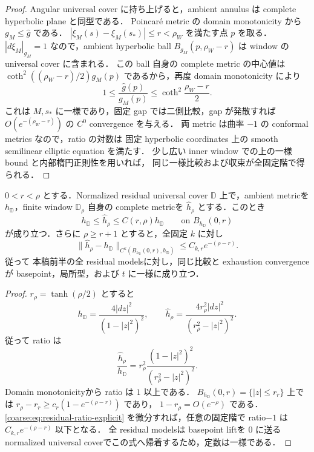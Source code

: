 \documentclass[a4paper,11pt]{ltjsarticle}
\numberwithin{equation}{section}
\theoremstyle{plain}
\theoremstyle{definition}
\theoremstyle{remark}
\begin{document}
\begin{proof}
Angular universal cover に持ち上げると，ambient annulus は complete hyperbolic plane と同型である．
Poincar\'e metric の domain monotonicity から $g_M\le\widehat g$ である．
$|\xi_M(s)-\xi_M(s_*)|\le r<\rho_W$ を満たす点 $p$ を取る．
$|d\xi_M|_{g_M}=1$ なので，ambient hyperbolic ball
$B_{g_M}(p,\rho_W-r)$ は window の universal cover に含まれる．
この ball 自身の complete metric の中心値は
$\coth^2((\rho_W-r)/2)g_M(p)$ であるから，再度 domain monotonicity により
\[
 1\le\frac{\widehat g(p)}{g_M(p)}
 \le\coth^2\!\frac{\rho_W-r}{2}.
\]
これは $M,s_*$ に一様であり，固定 gap では二側比較，gap が発散すれば
$O(e^{-(\rho_W-r)})$ の $C^0$ convergence を与える．
両 metric は曲率 $-1$ の conformal metrics なので，ratio の対数は
固定 hyperbolic coordinates 上の smooth semilinear elliptic equation を満たす．
少し広い inner window での上の一様 bound と内部楕円正則性を用いれば，
同じ一様比較および収束が全固定階で得られる．
\end{proof}

\begin{lemma}\label{coarse:lem:residual-window-comparison}
$0<r<\rho$ とする．Normalized residual universal cover $\mathbb D$ 上で，ambient metricを
$h_{\mathbb D}$，finite window $\mathbb D_\rho$ 自身の complete metricを
$\widehat h_\rho$ とする．このとき
\begin{equation}\label{coarse:eq:residual-window-comparison}
 h_{\mathbb D}\le \widehat h_\rho
 \le C(r,\rho)h_{\mathbb D}
 \qquad\text{on }B_{h_{\mathbb D}}(0,r)
\end{equation}
が成り立つ．さらに $\rho\ge r+1$ とすると，全固定 $k$ に対し
\begin{equation}\label{coarse:eq:residual-window-exhaustion}
 \|\widehat h_\rho-h_{\mathbb D}\|_{C^k(B_{h_{\mathbb D}}(0,r),h_{\mathbb D})}
 \le C_{k,r}e^{-(\rho-r)}.
\end{equation}
従って 本稿前半の全 residual modelsに対し，同じ比較と exhaustion convergenceが basepoint，局所型，および $t$ に一様に成り立つ．
\end{lemma}

\begin{proof}
$r_\rho=\tanh(\rho/2)$ とすると
\[
 h_{\mathbb D}=\frac{4|dz|^2}{(1-|z|^2)^2},
 \qquad
 \widehat h_\rho=\frac{4r_\rho^2|dz|^2}{(r_\rho^2-|z|^2)^2}.
\]
従って ratio は
\begin{equation}\label{coarse:eq:residual-ratio-explicit}
 \frac{\widehat h_\rho}{h_{\mathbb D}}
 =r_\rho^2\frac{(1-|z|^2)^2}{(r_\rho^2-|z|^2)^2}.
\end{equation}
Domain monotonicityから ratio は $1$ 以上である．
$B_{h_{\mathbb D}}(0,r)=\{|z|\le r_r\}$ 上では
$r_\rho-r_r\ge c_r(1-e^{-(\rho-r)})$ であり，
$1-r_\rho=O(e^{-\rho})$ である．
\eqref{coarse:eq:residual-ratio-explicit} を微分すれば，任意の固定階で
ratio$-1$ は $C_{k,r}e^{-(\rho-r)}$ 以下となる．
全 residual modelsは basepoint liftを $0$ に送る normalized universal coverでこの式へ帰着するため，定数は一様である．
\end{proof}
\end{document}
